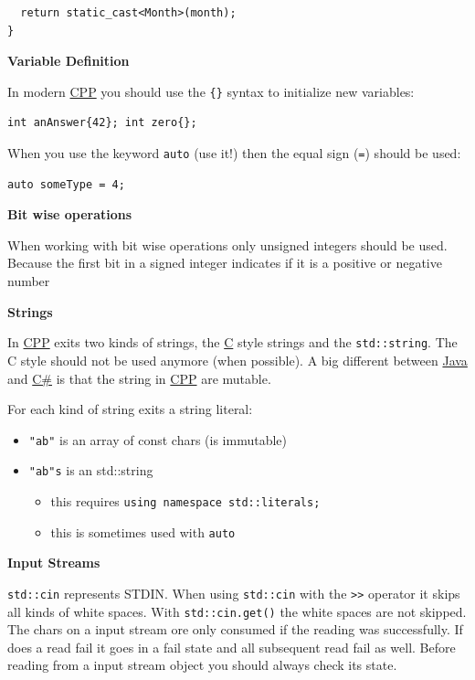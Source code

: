 \documentclass[11pt,twoside,landscape]{article}
\begin{document}
\begin{multicols}{3}
\begin{lstlisting}
  return static_cast<Month>(month);
}
\end{lstlisting}

\textbf{Variable Definition}

In modern \href{../../../roam/20210920103243-c.org}{CPP} you should use the \texttt{\{\}} syntax to initialize new variables:
\lstset{language=c++,label= ,caption= ,captionpos=b,numbers=none}
\begin{lstlisting}
int anAnswer{42}; int zero{};
\end{lstlisting}

When you use the keyword \texttt{auto} (use it!) then the equal sign (\texttt{=}) should be used:
\lstset{language=c++,label= ,caption= ,captionpos=b,numbers=none}
\begin{lstlisting}
auto someType = 4;
\end{lstlisting}

\textbf{Bit wise operations}

When working with bit wise operations only unsigned integers should be used.
Because the first bit in a signed integer indicates if it is a positive or negative number

\textbf{Strings}

In \href{../../../roam/20210920103243-c.org}{CPP} exits two kinds of strings, the \href{../../../roam/20211008113512-c.org}{C} style strings and the \texttt{std::string}.
The C style should not be used anymore (when possible).
A big different between \href{../../../roam/20201116150053-java.org}{Java} and \href{../../../roam/20211003114158-c.org}{C\#} is that the string in \href{../../../roam/20210920103243-c.org}{CPP} are mutable. 

For each kind of string exits a string literal:
\begin{itemize}
\item \texttt{"ab"} is an array of const chars (is immutable)
\item \texttt{"ab"s} is an std::string
\begin{itemize}
\item this requires \texttt{using namespace std::literals;}
\item this is sometimes used with \texttt{auto}
\end{itemize}
\end{itemize}


\textbf{Input Streams}

\texttt{std::cin} represents STDIN.
When using \texttt{std::cin} with the \texttt{>>} operator it skips all kinds of white spaces.
With \texttt{std::cin.get()} the white spaces are not skipped.
The chars on a input stream ore only consumed if the reading was successfully.
If does a read fail it goes in a fail state and all subsequent read fail as well.
Before reading from a input stream object you should always check its state.



\end{multicols}
\end{document}
